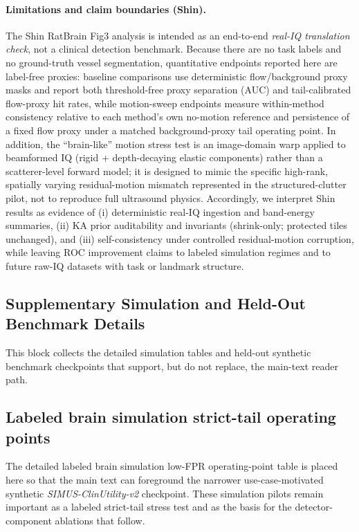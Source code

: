 \paragraph{Limitations and claim boundaries (Shin).}
The Shin RatBrain Fig3 analysis is intended as an end-to-end \emph{real-IQ translation check}, not a clinical detection benchmark.
Because there are no task labels and no ground-truth vessel segmentation, quantitative endpoints reported here are label-free proxies: baseline comparisons use deterministic flow/background proxy masks and report both threshold-free proxy separation (AUC) and tail-calibrated flow-proxy hit rates, while motion-sweep endpoints measure within-method consistency relative to each method's own no-motion reference and persistence of a fixed flow proxy under a matched background-proxy tail operating point.
In addition, the ``brain-like'' motion stress test is an image-domain warp applied to beamformed IQ (rigid + depth-decaying elastic components) rather than a scatterer-level forward model; it is designed to mimic the specific high-rank, spatially varying residual-motion mismatch represented in the structured-clutter pilot, not to reproduce full ultrasound physics.
Accordingly, we interpret Shin results as evidence of (i) deterministic real-IQ ingestion and band-energy summaries, (ii) KA prior auditability and invariants (shrink-only; protected tiles unchanged), and (iii) self-consistency under controlled residual-motion corruption, while leaving ROC improvement claims to labeled simulation regimes and to future raw-IQ datasets with task or landmark structure.

\subsection*{Supplementary Simulation and Held-Out Benchmark Details}
This block collects the detailed simulation tables and held-out synthetic benchmark checkpoints that support, but do not replace, the main-text reader path.

\subsection{Labeled brain simulation strict-tail operating points}
\label{app:brain-kwave-vnext-table}
The detailed labeled brain simulation low-FPR operating-point table is placed here so that the main text can foreground the narrower use-case-motivated synthetic \emph{SIMUS-ClinUtility-v2} checkpoint. These simulation pilots remain important as a labeled strict-tail stress test and as the basis for the detector-component ablations that follow.

